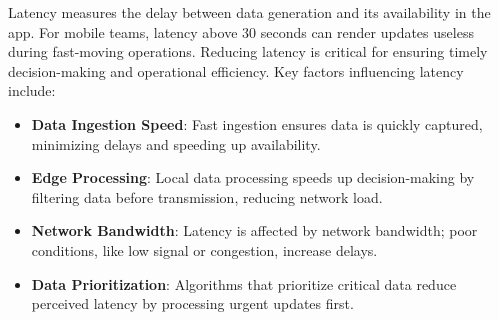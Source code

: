         Latency measures the delay between data generation and its availability in the app. For mobile teams, latency above 30 seconds can render updates useless during fast-moving operations. Reducing latency is critical for ensuring timely decision-making and operational efficiency. Key factors influencing latency include: \autocite{GeeksforGeeks2024Oct}

        \begin{itemize} 
            \item \textbf{Data Ingestion Speed}: Fast ingestion ensures data is quickly captured, minimizing delays and speeding up availability.
            \item \textbf{Edge Processing}: Local data processing speeds up decision-making by filtering data before transmission, reducing network load.
            \item \textbf{Network Bandwidth}: Latency is affected by network bandwidth; poor conditions, like low signal or congestion, increase delays.
            \item \textbf{Data Prioritization}: Algorithms that prioritize critical data reduce perceived latency by processing urgent updates first.

        \end{itemize}

\blankLine

